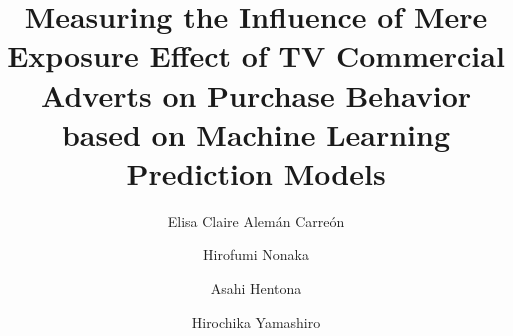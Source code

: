 \documentclass[review]{elsarticle}
\begin{document}
\begin{frontmatter}

\title{Measuring the Influence of Mere Exposure Effect of TV Commercial Adverts on Purchase Behavior based on Machine Learning Prediction Models}

\author[gidai]{Elisa Claire Alemán Carreón
}

\author[gidai]{Hirofumi Nonaka}

\author[gidai]{Asahi Hentona}

\author[gidai]{Hirochika Yamashiro}

\address[gidai]{Nagaoka University of Technology, Nagaoka, Japan}





\end{frontmatter}
\end{document}
